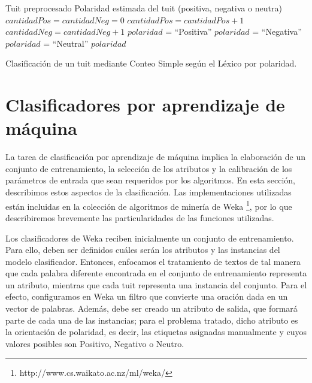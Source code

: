 \begin{algorithm}
\begin{algorithmic}
\REQUIRE Tuit preprocesado
\ENSURE Polaridad estimada del tuit (positiva, negativa o neutra)
\STATE $cantidadPos = cantidadNeg = 0$ 
\STATE $cantidadPos = cantidadPos + 1$
\STATE $cantidadNeg = cantidadNeg + 1$
\ENDIF
\ENDFOR
{}
\STATE $polaridad$ = ``Positiva''
\STATE $polaridad$ = ``Negativa''
\ELSE
\STATE $polaridad$ = ``Neutral''
\ENDIF
\RETURN $polaridad$
\end{algorithmic}
\caption{Clasificaci\'on de un tuit mediante Conteo Simple seg\'un el L\'exico por polaridad.}
\label{alg:simplecount}
\end{algorithm}

\section{Clasificadores por aprendizaje de m\'aquina}

La tarea de clasificaci\'on por aprendizaje de m\'aquina implica la elaboraci\'on de un conjunto de entrenamiento, la selecci\'on de los atributos y la calibraci\'on de los par\'ametros de entrada que sean requeridos por los algoritmos. En esta secci\'on, describimos estos aspectos de la clasificaci\'on. Las implementaciones utilizadas est\'an incluidas en la colecci\'on de algoritmos de miner\'ia de Weka \footnote{http://www.cs.waikato.ac.nz/ml/weka/}, por lo que describiremos brevemente las particularidades de las funciones utilizadas.
\newline

Los clasificadores de Weka reciben inicialmente un conjunto de entrenamiento. Para ello, deben ser definidos cu\'ales ser\'an los atributos y las instancias del modelo clasificador. Entonces, enfocamos el tratamiento de textos de tal manera que cada palabra diferente encontrada en el conjunto de entrenamiento representa un atributo, mientras que cada tuit representa una instancia del conjunto. Para el efecto, configuramos en Weka un filtro que convierte una oraci\'on dada en un vector de palabras. Adem\'as, debe ser creado un atributo de salida, que formar\'a parte de cada una de las instancias; para el problema tratado, dicho atributo es la orientaci\'on de polaridad, es decir, las etiquetas asignadas manualmente y cuyos valores posibles son Positivo, Negativo o Neutro.
\newline

